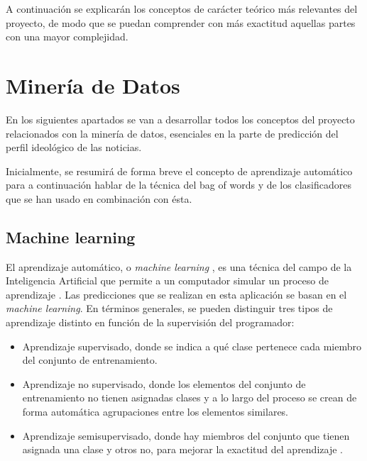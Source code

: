 A continuación se explicarán los conceptos de carácter teórico más relevantes del proyecto, de modo que se puedan comprender con más exactitud aquellas partes con una mayor complejidad.


\section{Minería de Datos}

En los siguientes apartados se van a desarrollar todos los conceptos del proyecto relacionados con la minería de datos, esenciales en la parte de predicción del perfil ideológico de las noticias.

Inicialmente, se resumirá de forma breve el concepto de aprendizaje automático para a continuación hablar de la técnica del bag of words y de los clasificadores que se han usado en combinación con ésta.

\subsection{Machine learning}

El aprendizaje automático, o \emph{machine learning} \cite{andrieu2003introduction}, es una técnica del campo de la Inteligencia Artificial que permite a un computador simular un proceso de aprendizaje \cite{wiki:machinelearning}. Las predicciones que se realizan en esta aplicación se basan en el \emph{machine learning}. En términos generales, se pueden distinguir tres tipos de aprendizaje distinto en función de la supervisión del programador:

\begin{itemize}

\item Aprendizaje supervisado, donde se indica a qué clase pertenece cada miembro del conjunto de entrenamiento.

\item Aprendizaje no supervisado, donde los elementos del conjunto de entrenamiento no tienen asignadas clases y a lo largo del proceso se crean de forma automática 
agrupaciones entre los elementos similares.

\item Aprendizaje semisupervisado, donde hay miembros del conjunto que tienen asignada una clase y otros no, para mejorar la exactitud del aprendizaje \cite{wiki:semisupervised}.

\end{itemize}


